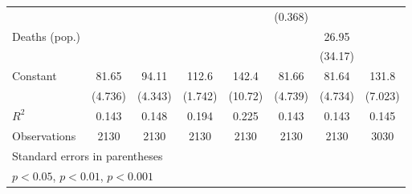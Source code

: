 \documentclass{article}
\begin{document}
{\begin{longtable}{l*{7}{c}}
                &                  &                  &                  &                  &  (0.368)         &                  &                  \\
Deaths (pop.)   &                  &                  &                  &                  &                  &    26.95         &                  \\
                &                  &                  &                  &                  &                  &  (34.17)         &                  \\
Constant        &    81.65\sym{***}&    94.11\sym{***}&    112.6\sym{***}&    142.4\sym{***}&    81.66\sym{***}&    81.64\sym{***}&    131.8\sym{***}\\
                &  (4.736)         &  (4.343)         &  (1.742)         &  (10.72)         &  (4.739)         &  (4.734)         &  (7.023)         \\
\hline
\(R^{2}\)       &    0.143         &    0.148         &    0.194         &    0.225         &    0.143         &    0.143         &    0.145         \\
Observations    &     2130         &     2130         &     2130         &     2130         &     2130         &     2130         &     3030         \\
\hline\hline
\multicolumn{8}{l}{\footnotesize Standard errors in parentheses}\\
\multicolumn{8}{l}{\footnotesize \sym{*} \(p<0.05\), \sym{**} \(p<0.01\), \sym{***} \(p<0.001\)}\\
\end{longtable}
}
\end{document}
